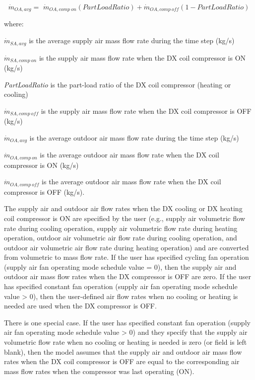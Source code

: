 \begin{equation}
\dot m{_{OA,avg}} = \,\,\dot m{_{OA,comp~on}}\left( {PartLoadRatio} \right) + \dot m{_{OA,comp~off}}\left( {1 - PartLoadRatio} \right)
\end{equation}

where:

\(\dot m{_{SA,avg}}\) is the average supply air mass flow rate during the time step (kg/s)

\(\dot m{_{SA,comp~on}}\) is the supply air mass flow rate when the DX coil compressor is ON (kg/s)

\emph{PartLoadRatio} is the part-load ratio of the DX coil compressor (heating or cooling)

\(\dot m{_{SA,comp~off}}\) is the supply air mass flow rate when the DX coil compressor is OFF (kg/s)

\(\dot m{_{OA,avg}}\) is the average outdoor air mass flow rate during the time step (kg/s)

\(\dot m{_{OA,comp~on}}\) is the average outdoor air mass flow rate when the DX coil compressor is ON (kg/s)

\(\dot m{_{OA,comp~off}}\) is the average outdoor air mass flow rate when the DX coil compressor is OFF (kg/s).

The supply air and outdoor air flow rates when the DX cooling or DX heating coil compressor is ON are specified by the user (e.g., supply air volumetric flow rate during cooling operation, supply air volumetric flow rate during heating operation, outdoor air volumetric air flow rate during cooling operation, and outdoor air volumetric air flow rate during heating operation) and are converted from volumetric to mass flow rate. If the user has specified cycling fan operation (supply air fan operating mode schedule value = 0), then the supply air and outdoor air mass flow rates when the DX compressor is OFF are zero. If the user has specified constant fan operation (supply air fan operating mode schedule value \textgreater{} 0), then the user-defined air flow rates when no cooling or heating is needed are used when the DX compressor is OFF.

There is one special case. If the user has specified constant fan operation (supply air fan operating mode schedule value \textgreater{} 0) and they specify that the supply air volumetric flow rate when no cooling or heating is needed is zero (or field is left blank), then the model assumes that the supply air and outdoor air mass flow rates when the DX coil compressor is OFF are equal to the corresponding air mass flow rates when the compressor was last operating (ON).

